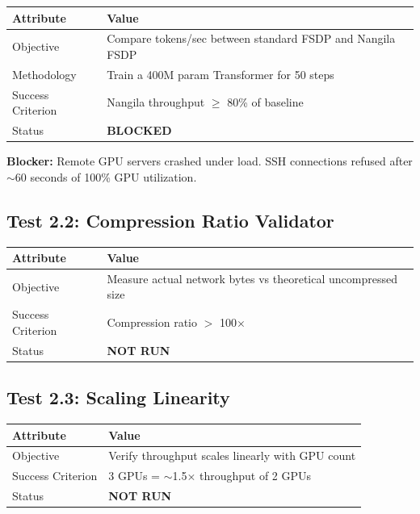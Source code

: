 \documentclass[11pt,a4paper]{article}
\begin{document}
\begin{table}[h]
\centering
\begin{tabular}{@{}ll@{}}
\toprule
\textbf{Attribute} & \textbf{Value} \\
\midrule
Objective & Compare tokens/sec between standard FSDP and Nangila FSDP \\
Methodology & Train a 400M param Transformer for 50 steps \\
Success Criterion & Nangila throughput $\geq$ 80\% of baseline \\
Status & \textcolor{blocked}{\textbf{BLOCKED}} \\
\bottomrule
\end{tabular}
\end{table}

\textbf{Blocker:} Remote GPU servers crashed under load. SSH connections refused after $\sim$60 seconds of 100\% GPU utilization.

\subsection{Test 2.2: Compression Ratio Validator}

\begin{table}[h]
\centering
\begin{tabular}{@{}ll@{}}
\toprule
\textbf{Attribute} & \textbf{Value} \\
\midrule
Objective & Measure actual network bytes vs theoretical uncompressed size \\
Success Criterion & Compression ratio $>$ 100$\times$ \\
Status & \textcolor{blocked}{\textbf{NOT RUN}} \\
\bottomrule
\end{tabular}
\end{table}

\subsection{Test 2.3: Scaling Linearity}

\begin{table}[h]
\centering
\begin{tabular}{@{}ll@{}}
\toprule
\textbf{Attribute} & \textbf{Value} \\
\midrule
Objective & Verify throughput scales linearly with GPU count \\
Success Criterion & 3 GPUs = $\sim$1.5$\times$ throughput of 2 GPUs \\
Status & \textcolor{blocked}{\textbf{NOT RUN}} \\
\bottomrule
\end{tabular}
\end{table}
\end{document}
